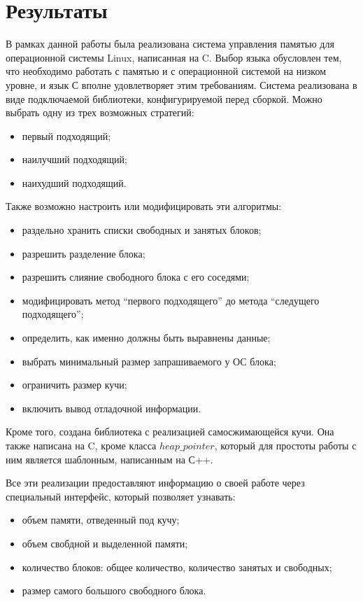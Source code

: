 \section{Результаты}
В рамках данной работы была реализована система управления памятью для операционной 
системы Linux, написанная на C. Выбор языка обусловлен тем, что необходимо работать с памятью и 
с операционной системой на низком уровне, и язык С вполне удовлетворяет этим требованиям.
Система реализована в виде подключаемой библиотеки,
конфигурируемой перед сборкой. Можно выбрать одну из трех возможных стратегий:
\begin{itemize}
\item первый подходящий;
\item наилучший подходящий;
\item наихудший подходящий.
\end{itemize}
Также возможно настроить или модифицировать эти алгоритмы:
\begin{itemize}
\item раздельно хранить списки свободных и занятых блоков;
\item разрешить разделение блока;
\item разрешить слияние свободного блока с его соседями;
\item модифицировать метод ``первого подходящего'' до метода ``следущего подходящего'';
\item определить, как именно должны быть выравнены данные;
\item выбрать минимальный размер запрашиваемого у ОС блока;
\item ограничить размер кучи;
\item включить вывод отладочной информации.
\end{itemize}

Кроме того, создана библиотека с реализацией самосжимающейся кучи. Она также написана на C,
кроме класса $heap\_pointer$, который для простоты работы с ним является шаблонным,
написанным на С++. 

Все эти реализации предоставляют информацию о своей работе через специальный интерфейс,
который позволяет узнавать:
\begin{itemize}
\item объем памяти, отведенный под кучу;
\item объем свобдной и выделенной памяти;
\item количество блоков: общее количество, количество занятых и свободных;
\item размер самого большого свободного блока.
\end{itemize}

